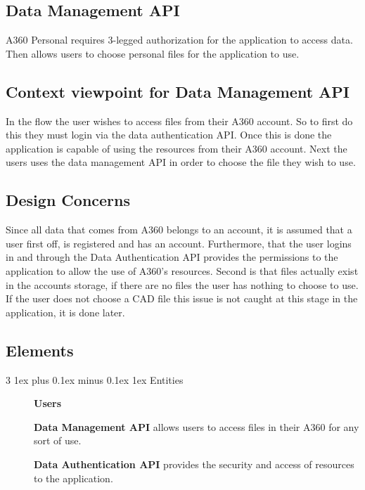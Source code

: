 \documentclass[letterpaper, 10pt, draftclsnofoot, compsoc, onecolumn]{IEEEtran}
\makeatletter
\def\subsubsection{\@startsection{subsubsection}%
                                 {3}%
                                 {\z@}%
                                 {1ex plus 0.1ex minus 0.1ex}%
                                 {1ex}%
                                 {\normalfont\normalsize}}%
\makeatother
\begin{document}
\subsection{Data Management API}
\label{A360} 
	A360 Personal requires 3-legged authorization for the application to access data. Then allows users to choose personal files for the application to use.
\subsection{Context viewpoint for Data Management API}
	In the flow the user wishes to access files from their A360 account. So to first do this they must login via the data authentication API. Once this is done the application is capable of using the resources from their A360 account. Next the users uses the data management API in order to choose the file they wish to use. 
\subsection{Design Concerns}
	Since all data that comes from A360 belongs to an account, it is assumed that a user first off, is registered and has an account. Furthermore, that the user logins in and through the Data Authentication API provides the permissions to the application to allow the use of A360's resources. Second is that files actually exist in the accounts storage, if there are no files the user has nothing to choose to use. If the user does not choose a CAD file this issue is not caught at this stage in the application, it is done later.
\subsection{Elements}
\subsubsection{Entities}
\begin{description}
	\item[]\textbf{Users} 
	\item[]\textbf{Data Management API} allows users to access files in their A360 for any sort of use.
	\item[]\textbf{Data Authentication API} provides the security and access of resources to the application.
\end{description}
\end{document}
